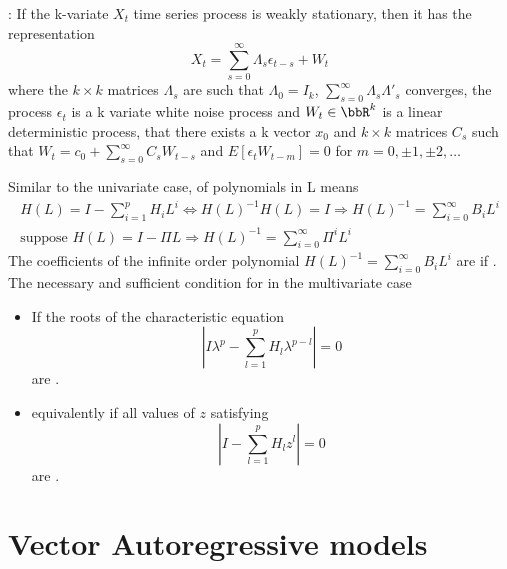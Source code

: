 \begin{theorem}
    : If the k-variate $X_t$ time series process is weakly stationary, then it has the representation
    \begin{equation*}
        X_t = \sum_{s=0}^{\infty} \Lambda_s \epsilon_{t-s} + W_t
    \end{equation*}
    where the $k\times k$ matrices $\Lambda_s$ are such that $\Lambda_0 = I_k$, $\sum_{s=0}^{\infty} \Lambda_s \Lambda'_s$ converges, the process $\epsilon_t$ is a k variate white noise process and 
    $W_t\in\bbR^k$ is a linear deterministic process, that there exists a k vector $x_0$ and $k\times k$ matrices $C_s$ such that $W_t = c_0 + \sum_{s=0}^{\infty} C_s W_{t-s}$ and $E[\epsilon_t W_{t-m}] = 0$ for $m = 0,\pm 1, \pm 2,\ldots$
\end{theorem}
Similar to the univariate case,  of polynomials in L means
\begin{gather*}
    H(L) = I - \sum_{i=1}^{p}H_i L^i \Leftrightarrow H(L)^{-1}H(L) = I \Rightarrow H(L)^{-1} = \sum_{i=0}^{\infty} B_i L^i\\
    \text{suppose } H(L) = I - \Pi L \Rightarrow H(L)^{-1} = \sum_{i=0}^{\infty} \Pi^i L^i
\end{gather*}
The coefficients of the infinite order polynomial $H(L)^{-1} = \sum_{i=0}^{\infty} B_i L^i$ are  if .
The necessary and sufficient condition for  in the multivariate case
\begin{itemize}
    \item If the roots of the characteristic equation
    \begin{equation*}
        \left|I\lambda^p - \sum_{l=1}^{p}H_l\lambda^{p-l}\right| = 0
    \end{equation*}
    are .
    \item equivalently if all values of $z$ satisfying
    \begin{equation*}
        \left|I - \sum_{l=1}^{p}H_l z^l\right| = 0
    \end{equation*}
    are .
\end{itemize}

\section{Vector Autoregressive models}

